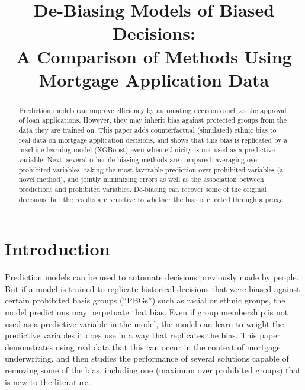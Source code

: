 
\title{De-Biasing Models of Biased Decisions: \\ A Comparison of Methods Using Mortgage Application Data}
\maketitle
\begin{abstract}
Prediction models can improve efficiency by automating decisions such as the approval of loan applications. However, they may inherit bias against protected groups from the data they are trained on. This paper adds counterfactual (simulated) ethnic bias to real data on mortgage application decisions, and shows that this bias is replicated by a machine learning model (XGBoost) even when ethnicity is not used as a predictive variable. Next, several other de-biasing methods are compared: averaging over prohibited variables, taking the most favorable prediction over prohibited variables (a novel method), and jointly minimizing errors as well as the association between predictions and prohibited variables. De-biasing can recover some of the original decisions, but the results are sensitive to whether the bias is effected through a proxy.
\end{abstract}




\section{Introduction}\label{sec:intro}


Prediction models can be used to automate decisions previously made by people. But if a model is trained to replicate historical decisions that were biased against certain prohibited basis groups (``PBGs'') such as racial or ethnic groups, the model predictions may perpetuate that bias. Even if group membership is not used as a predictive variable in the model, the model can learn to weight the predictive variables it does use in a way that replicates the bias. This paper demonstrates using real data that this can occur in the context of mortgage underwriting, and then studies the performance of several solutions capable of removing some of the bias, including one (maximum over prohibited groups) that is new to the literature.


